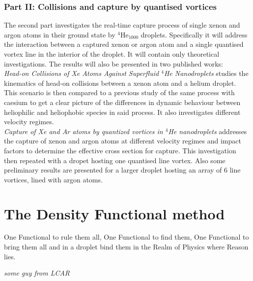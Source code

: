 \documentclass[12pt,a4paper]{book}
\begin{document}
		\subsection{Part II: Collisions and capture by quantised vortices}
			The second part investigates the real-time capture process of single xenon and argon atoms in their ground state by $^4$He$_{1000}$ droplets. Specifically it will address the interaction between a captured xenon or argon atom and a single quantised vortex line in the interior of the droplet. It will contain only theoretical investigations. The results will also be presented in two published works:\\
		
			\emph{Head-on Collisions of Xe Atoms Against Superfluid $^4\!$He Nanodroplets} studies the kinematics of head-on collisions between a xenon atom and a helium droplet. This scenario is then compared to a previous study of the same process with caesium to get a clear picture of the differences in dynamic behaviour between heliophilic and heliophobic species in said process. It also investigates different velocity regimes.\\
		
			\emph{Capture of Xe and Ar atoms by quantized vortices in $^4\!$He nanodroplets} addresses the capture of xenon and argon atoms at different velocity regimes and impact factors to determine the effective cross section for capture. This investigation then repeated with a dropet hosting one quantised line vortex. Also some preliminary results are presented for a larger droplet hosting an array of 6 line vortices, lined with argon atoms.

	\chapter{The Density Functional method}\label{sec:dft-method}
		\epigraph{One Functional to rule them all,
		One Functional to find them,
		One Functional to bring them all
		and in a droplet bind them
		in the Realm of Physics where Reason lies.}{\textit{some guy from LCAR}}
\end{document}
